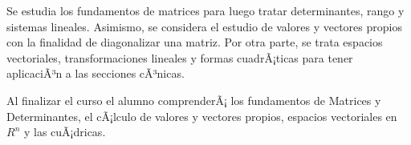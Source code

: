 \begin{syllabus}


\begin{justification}
Se estudia los fundamentos de matrices para luego tratar determinantes, rango y sistemas lineales. Asimismo, se considera el estudio de valores y vectores propios con la finalidad de diagonalizar una matriz. Por otra parte, se trata espacios vectoriales, transformaciones lineales y formas cuadrÃ¡ticas para tener aplicaciÃ³n a las secciones cÃ³nicas.
\end{justification}

\begin{goals}
\item Al finalizar el curso el alumno comprenderÃ¡ los fundamentos de Matrices y Determinantes, el cÃ¡lculo de valores y vectores propios, espacios vectoriales en $R^n$ y las cuÃ¡dricas.
\end{goals}

\begin{outcomes}
\end{outcomes}


\end{syllabus}
